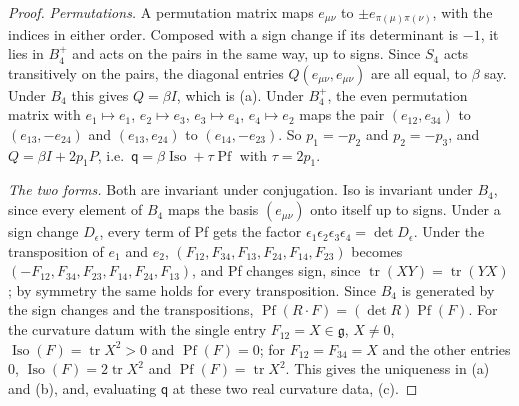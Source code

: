 \begin{proof}
\emph{Permutations.} A permutation matrix maps $e_{\mu\nu}$ to $\pm e_{\pi(\mu)\pi(\nu)}$, with the indices in either order. Composed with a sign change if its determinant is $-1$, it lies in $B_4^+$ and acts on the pairs in the same way, up to signs. Since $S_4$ acts transitively on the pairs, the diagonal entries $Q(e_{\mu\nu},e_{\mu\nu})$ are all equal, to $\beta$ say. Under $B_4$ this gives $Q=\beta I$, which is (a). Under $B_4^+$, the even permutation matrix with $e_1\mapsto e_1$, $e_2\mapsto e_3$, $e_3\mapsto e_4$, $e_4\mapsto e_2$ maps the pair $(e_{12},e_{34})$ to $(e_{13},-e_{24})$ and $(e_{13},e_{24})$ to $(e_{14},-e_{23})$. So $p_1=-p_2$ and $p_2=-p_3$, and $Q=\beta I+2p_1P$, i.e.\ $\mathsf q=\beta\operatorname{Iso}+\tau\operatorname{Pf}$ with $\tau=2p_1$.

\emph{The two forms.} Both are invariant under conjugation. Iso is invariant under $B_4$, since every element of $B_4$ maps the basis $(e_{\mu\nu})$ onto itself up to signs. Under a sign change $D_\epsilon$, every term of Pf gets the factor $\epsilon_1\epsilon_2\epsilon_3\epsilon_4=\det D_\epsilon$. Under the transposition of $e_1$ and $e_2$, $(F_{12},F_{34},F_{13},F_{24},F_{14},F_{23})$ becomes $(-F_{12},F_{34},F_{23},F_{14},F_{24},F_{13})$, and Pf changes sign, since $\operatorname{tr}(XY)=\operatorname{tr}(YX)$; by symmetry the same holds for every transposition. Since $B_4$ is generated by the sign changes and the transpositions, $\operatorname{Pf}(R\cdot F)=(\det R)\operatorname{Pf}(F)$. For the curvature datum with the single entry $F_{12}=X\in\mathfrak g$, $X\ne0$, $\operatorname{Iso}(F)=\operatorname{tr}X^2>0$ and $\operatorname{Pf}(F)=0$; for $F_{12}=F_{34}=X$ and the other entries $0$, $\operatorname{Iso}(F)=2\operatorname{tr}X^2$ and $\operatorname{Pf}(F)=\operatorname{tr}X^2$. This gives the uniqueness in (a) and (b), and, evaluating $\mathsf q$ at these two real curvature data, (c).
\end{proof}

